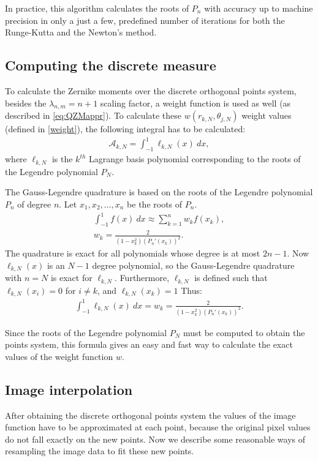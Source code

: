 In practice, this algorithm calculates the roots of $P_n$ with accuracy up to machine precision in only a just a few, predefined number of iterations for both the Runge-Kutta and the Newton's method.

\subsection{Computing the discrete measure}
To calculate the Zernike moments over the discrete orthogonal points system, besides the $\lambda_{n,m} = n + 1$ scaling factor, a weight function is used as well (as described in \eqref{eq:QZMappr}). To calculate these $w(r_{k,N},\theta_{j,N})$ weight values (defined in \eqref{weight}), the following integral has to be calculated:
\begin{gather*}
    \mathcal{A}_{k,N} = \int_{-1}^{1}\ell_{k,N}(x)\ dx,
\end{gather*}
where $\ell_{k,N}$ is the $k^{th}$ Lagrange basis polynomial corresponding to the roots of the Legendre polynomial $P_N$.

The Gauss-Legendre quadrature is based on the roots of the Legendre polynomial $P_n$ of degree $n$. Let $x_1,x_2,\ldots,x_n$ be the roots of $P_n$.
\begin{gather*}
    \int_{-1}^{1}f(x)\ dx \approx \sum_{k=1}^n w_k f(x_k), \\
    w_k = \frac{2}{(1-x_k^2)(P_n'(x_k))^2}.
\end{gather*}
The quadrature is exact for all polynomials whose degree is at most $2n-1$. Now $\ell_{k,N}(x)$ is an $N-1$ degree polynomial, so the Gauss-Legendre quadrature with $n=N$ is exact for $\ell_{k,N}$. Furthermore, $\ell_{k,N}$ is defined such that $\ell_{k,N}(x_i) = 0$ for $i \neq k$, and $\ell_{k,N}(x_k) = 1$ Thus:
\begin{gather*}
    \int_{-1}^{1}\ell_{k,N}(x)\ dx = w_k = \frac{2}{(1-x_k^2)(P_n'(x_k))^2}.
\end{gather*}

Since the roots of the Legendre polynomial $P_N$ must be computed to obtain the points system, this formula gives an easy and fast way to calculate the exact values of the weight function $w$.

\subsection{Image interpolation}
After obtaining the discrete orthogonal points system the values of the image function have to be approximated at each point, because the original pixel values do not fall exactly on the new points. Now we describe some reasonable ways of resampling the image data to fit these new points.

